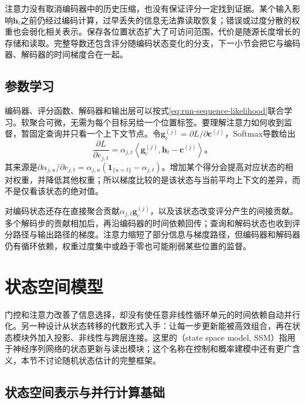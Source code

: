 注意力没有取消编码器中的历史压缩，也没有保证评分一定找到证据。某个输入影响$\bm h_t$之前仍经过编码计算，过早丢失的信息无法靠读取恢复；错误或过度分散的权重也会弱化相关表示。保存各位置状态扩大了可访问范围，代价是随源长度增长的存储和读取。完整导数还包含评分随编码状态变化的分支，下一小节会把它与编码器、解码器的时间梯度合在一起。

\subsection{参数学习}
\label{sec:rnn-attention-learning}

编码器、评分函数、解码器和输出层可以按式\eqref{eq:rnn-sequence-likelihood}联合学习。软聚合可微，无需为每个目标另给一个位置标签。要理解注意力如何收到监督，暂固定查询并只看一个上下文节点。令$\bm{g}_{\mathrm{c}}^{(j)}=\partial L/\partial\bm{c}^{(j)}$，Softmax导数给出
\begin{equation}
  \frac{\partial L}{\partial e_{j,t}}
    =\alpha_{j,t}\left\langle
      \bm{g}_{\mathrm{c}}^{(j)},\bm{h}_t-\bm{c}^{(j)}\right\rangle\text{。}
  \label{eq:rnn-attention-score-gradient}
\end{equation}
其来源是$\partial\alpha_{j,u}/\partial e_{j,t}=\alpha_{j,u}(\mathbf{1}_{\{u=t\}}-\alpha_{j,t})$。增加某个得分会提高对应状态的相对权重，并降低其他权重；所以梯度比较的是该状态与当前平均上下文的差异，而不是仅看该状态的绝对值。

对编码状态还存在直接聚合贡献$\alpha_{j,t}\bm{g}_{\mathrm{c}}^{(j)}$，以及该状态改变评分产生的间接贡献。多个解码步的贡献相加后，再沿编码器的时间依赖回传；查询和解码状态也收到评分路径与输出路径的梯度。注意力缩短了部分信息与梯度路径，但编码器和解码器仍有循环依赖，权重过度集中或趋于零也可能削弱某些位置的监督。

\section{状态空间模型}
\label{sec:rnn-state-space}

门控和注意力改善了信息选择，却没有使任意非线性循环单元的时间依赖自动并行化。另一种设计从状态转移的代数形式入手：让每一步更新能被高效组合，再在状态模块外加入投影、非线性与跨层连接。这里的（state space model, SSM）指用于神经序列网络的状态更新与读出模块；这个名称在控制和概率建模中还有更广含义，本节不讨论随机状态估计的完整框架。

\subsection{状态空间表示与并行计算基础}
\label{sec:rnn-ssm-foundations}

